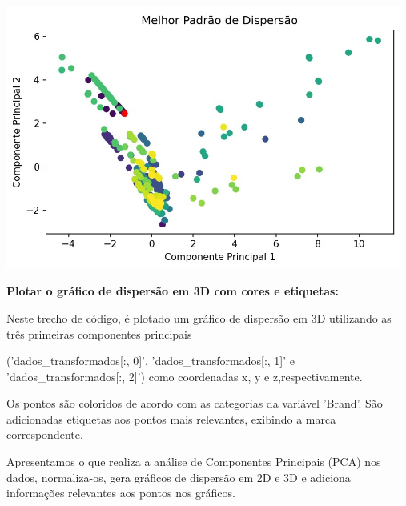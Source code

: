 \documentclass[12pt, a4paper]{article}
\begin{document}
\begin{center}
    \includegraphics[width=13cm]{figura8.jpg}
\end{center}
\textbf{Plotar o gráfico de dispersão em 3D com cores e etiquetas:}


Neste trecho de código, é plotado um gráfico de dispersão em 3D utilizando as três primeiras componentes principais 

\sloppy('dados\_transformados[:, 0]', 'dados\_transformados[:, 1]' e 'dados\_transformados[:, 2]') como coordenadas x, y e z,respectivamente.

Os pontos são coloridos de acordo com as categorias da variável 'Brand'.
São adicionadas etiquetas aos pontos mais relevantes, exibindo a marca correspondente.

Apresentamos o que realiza a análise de Componentes Principais (PCA) nos dados, normaliza-os, gera gráficos de dispersão em 2D e 3D e adiciona informações relevantes aos pontos nos gráficos.
\end{document}
